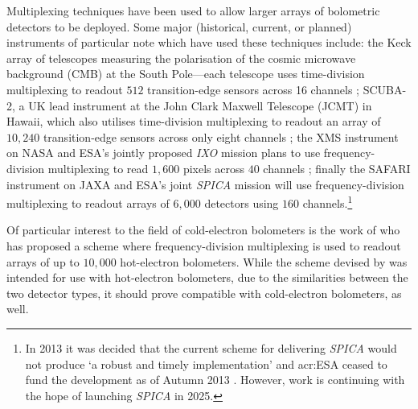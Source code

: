 \par 
Multiplexing techniques have been used to allow larger arrays of bolometric detectors to be deployed. Some major (historical, current, or planned) instruments of particular note which have used these techniques include: the Keck array of telescopes measuring the polarisation of the cosmic microwave background (CMB) at the South Pole---each telescope uses time-division multiplexing to readout $512$ transition-edge sensors across 16 channels \parencite{Orlando2010}; SCUBA-2, a UK lead instrument at the John Clark Maxwell Telescope (JCMT) in Hawaii, which also utilises time-division multiplexing to readout an array of $10,240$ transition-edge sensors  across only eight channels \parencite{Holland2013}; the XMS instrument on NASA and ESA's jointly proposed \textit{IXO} mission plans to use frequency-division multiplexing to read $1,600$ pixels across $40$ channels \parencite{denHartog2011}; finally the SAFARI instrument on JAXA and ESA's joint \textit{SPICA} mission will use frequency-division multiplexing to readout arrays of $6,000$ detectors using $160$ channels.\footnote{In 2013 it was decided that the current scheme for delivering \textit{SPICA} would not produce `a robust and timely implementation' and \gls{acr:ESA} ceased to fund the development as of Autumn 2013 \parencite{ESA2014}. However, work is continuing \parencite{SRON2014} with the hope of launching \textit{SPICA} in 2025.}
\par 
Of particular interest to the field of cold-electron bolometers is the work of \textcite{Schmidt2005} who has proposed a scheme where frequency-division multiplexing is used to readout arrays of up to $10,000$ hot-electron bolometers. While the scheme devised by \citeauthor{Schmidt2005} was intended for use with hot-electron bolometers, due to the similarities between the two detector types, it should prove compatible with cold-electron bolometers, as well.
%
